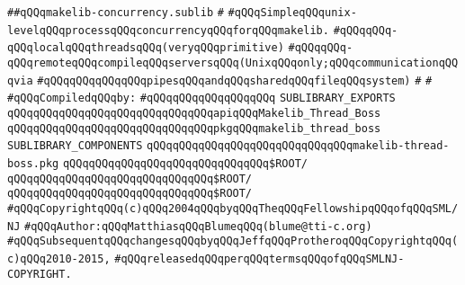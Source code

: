\label{src/app/makelib/concurrency/makelib-concurrency.sublib}
\verb|##qQQqmakelib-concurrency.sublib|\newline
\verb|#|\newline
\verb|#qQQqSimpleqQQqunix-levelqQQqprocessqQQqconcurrencyqQQqforqQQqmakelib.|\newline
\verb|#qQQqqQQq-qQQqlocalqQQqthreadsqQQq(veryqQQqprimitive)|\newline
\verb|#qQQqqQQq-qQQqremoteqQQqcompileqQQqserversqQQq(UnixqQQqonly;qQQqcommunicationqQQqvia|\newline
\verb|#qQQqqQQqqQQqqQQqpipesqQQqandqQQqsharedqQQqfileqQQqsystem)|\newline
\verb|#|\newline
\verb|#|\newline
\newline
\verb|#qQQqCompiledqQQqby:|\newline
\verb|#qQQqqQQqqQQqqQQqqQQq|\newline
\newline
\verb|SUBLIBRARY_EXPORTS|\newline
\newline
\verb|qQQqqQQqqQQqqQQqqQQqqQQqqQQqqQQqapiqQQqMakelib_Thread_Boss|\newline
\verb|qQQqqQQqqQQqqQQqqQQqqQQqqQQqqQQqpkgqQQqmakelib_thread_boss|\newline
\newline
\verb|SUBLIBRARY_COMPONENTS|\newline
\newline
\verb|qQQqqQQqqQQqqQQqqQQqqQQqqQQqqQQqmakelib-thread-boss.pkg|\newline
\newline
\verb|qQQqqQQqqQQqqQQqqQQqqQQqqQQqqQQq$ROOT/|\newline
\verb|qQQqqQQqqQQqqQQqqQQqqQQqqQQqqQQq$ROOT/|\newline
\verb|qQQqqQQqqQQqqQQqqQQqqQQqqQQqqQQq$ROOT/|\newline
\newline
\newline
\verb|#qQQqCopyrightqQQq(c)qQQq2004qQQqbyqQQqTheqQQqFellowshipqQQqofqQQqSML/NJ|\newline
\verb|#qQQqAuthor:qQQqMatthiasqQQqBlumeqQQq(blume@tti-c.org)|\newline
\verb|#qQQqSubsequentqQQqchangesqQQqbyqQQqJeffqQQqProtheroqQQqCopyrightqQQq(c)qQQq2010-2015,|\newline
\verb|#qQQqreleasedqQQqperqQQqtermsqQQqofqQQqSMLNJ-COPYRIGHT.|\newline

